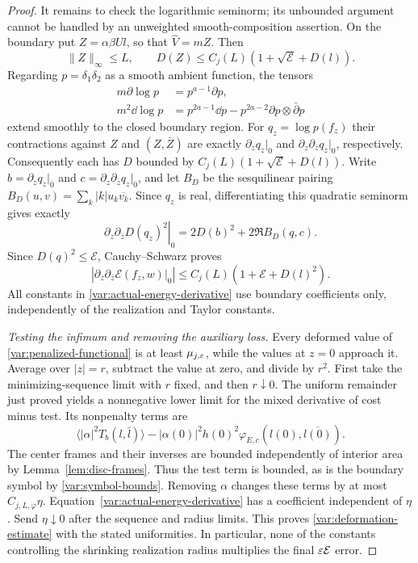 \begin{proof}
It remains to check the logarithmic seminorm; its unbounded argument
cannot be handled by an unweighted smooth-composition assertion.
On the boundary put $Z=\alpha\beta Ul$, so that $\widehat V=mZ$.
Then
\[
 \|Z\|_\infty\le L,\qquad
 D(Z)\le C_j(L)(1+\sqrt{\mathcal E}+D(l)).
\]
Regarding $p=\delta_1\delta_2$ as a smooth ambient function, the tensors
\begin{equation}
 \begin{split}
 m\partial\log p&=p^{a-1}\partial p,\\
 m^2\dd\log p&=p^{2a-1}\dd p
                  -p^{2a-2}\partial p\otimes\bar\partial p
 \end{split}
 \label{var:cleared-log-tensors}
\end{equation}
extend smoothly to the closed boundary region.
For $q_z=\log p(f_z)$ their contractions against $Z$ and
$(Z,\bar Z)$ are exactly $\partial_zq_z|_0$ and
$\partial_z\partial_{\bar z}q_z|_0$, respectively.  Consequently each
has $D$ bounded by $C_j(L)(1+\sqrt{\mathcal E}+D(l))$.
Write $b=\partial_zq_z|_0$ and $c=\partial_z\partial_{\bar z}q_z|_0$,
and let $B_D$ be the sesquilinear pairing
$B_D(u,v)=\sum_k|k|u_k\overline{v_k}$.  Since $q_z$ is real,
differentiating this quadratic seminorm gives exactly
\begin{equation}
 \left.\partial_z\partial_{\bar z}D(q_z)^2\right|_0
       =2D(b)^2+2\Re B_D(q,c).
 \label{var:log-energy-identity}
\end{equation}
Since $D(q)^2\le\mathcal E$, Cauchy--Schwarz proves
\begin{equation}
 \left|\left.\partial_z\partial_{\bar z}
                 \mathcal E(f_z,w)\right|_0\right|
 \le C_j(L)(1+\mathcal E+D(l)^2).
 \label{var:actual-energy-derivative}
\end{equation}
All constants in \eqref{var:actual-energy-derivative} use boundary
coefficients only, independently of the realization and Taylor constants.

\emph{Testing the infimum and removing the auxiliary loss.}
Every deformed value of \eqref{var:penalized-functional} is at least
$\mu_{j,\varepsilon}$, while the values at $z=0$ approach it.  Average over
$|z|=r$, subtract the value at zero, and divide by $r^2$.
First take the minimizing-sequence limit with $r$ fixed, and then
$r\downarrow0$.  The uniform remainder just proved yields a
nonnegative lower limit for the mixed derivative of cost minus test.
Its nonpenalty terms are
\[
 \langle|\alpha|^2 T_b(l,\bar l)\rangle
 -|\alpha(0)|^2h(0)^2\varphi_{E,c}(l(0),\overline{l(0)}).
\]
The center frames and their inverses are bounded independently of
interior area by Lemma~\ref{lem:disc-frames}.  Thus the test term is
bounded, as is the boundary symbol by \eqref{var:symbol-bounds}.
Removing $\alpha$ changes these terms by at most $C_{j,L,\varphi}\eta$.
Equation~\eqref{var:actual-energy-derivative} has a coefficient
independent of $\eta$.  Send $\eta\downarrow0$ after the sequence and
radius limits.  This proves \eqref{var:deformation-estimate} with the
stated uniformities.  In particular, none of the constants controlling
the shrinking realization radius multiplies the final $\varepsilon\mathcal E$
error.
\end{proof}

